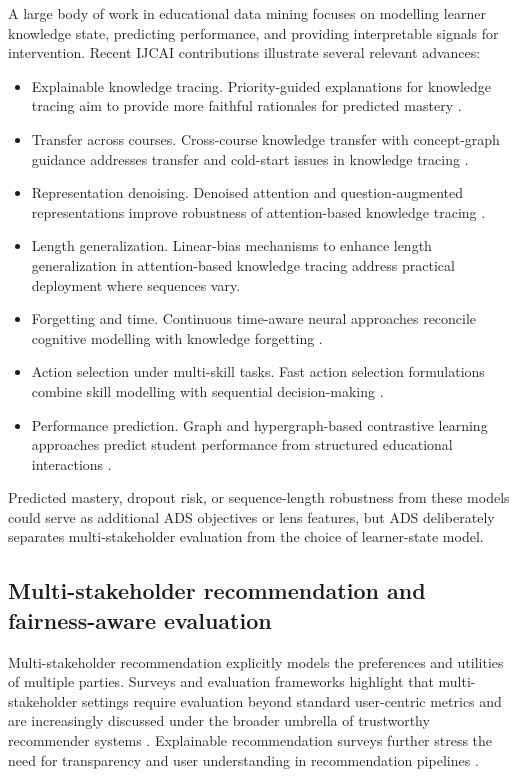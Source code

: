\documentclass[sigconf,review]{acmart}
\begin{document}
A large body of work in educational data mining focuses on modelling learner knowledge state, predicting performance, and providing interpretable signals for intervention.
Recent IJCAI contributions illustrate several relevant advances:
\begin{itemize}
    \item {Explainable knowledge tracing.} Priority-guided explanations for knowledge tracing aim to provide more faithful rationales for predicted mastery \cite{li2025pgexplainkt}.
    \item {Transfer across courses.} Cross-course knowledge transfer with concept-graph guidance addresses transfer and cold-start issues in knowledge tracing \cite{han2025transkt}.
    \item {Representation denoising.} Denoised attention and question-augmented representations improve robustness of attention-based knowledge tracing \cite{deng2025denoisekt}.
    \item {Length generalization.} Linear-bias mechanisms to enhance length generalization in attention-based knowledge tracing \cite{li2024stablekt} address practical deployment where sequences vary.
    \item {Forgetting and time.} Continuous time-aware neural approaches reconcile cognitive modelling with knowledge forgetting \cite{ma2022ctncm}.
    \item {Action selection under multi-skill tasks.} Fast action selection formulations combine skill modelling with sequential decision-making \cite{salomons2021bktpomdp}.
    \item {Performance prediction.} Graph and hypergraph-based contrastive learning approaches predict student performance from structured educational interactions \cite{song2025mhmgcl}.
\end{itemize}

\noindent
Predicted mastery, dropout risk, or sequence-length robustness from these models could serve as additional ADS objectives or lens features, but ADS deliberately separates multi-stakeholder evaluation from the choice of learner-state model.

\subsection{Multi-stakeholder recommendation and fairness-aware evaluation}
\label{sec:rw-ms}

Multi-stakeholder recommendation explicitly models the preferences and utilities of multiple parties.
Surveys and evaluation frameworks highlight that multi-stakeholder settings require evaluation beyond standard user-centric metrics \cite{abdollahpouri2020multistakeholder,burke2025mseval} and are increasingly discussed under the broader umbrella of trustworthy recommender systems \cite{ge2024trustworthyRS}.
Explainable recommendation surveys further stress the need for transparency and user understanding in recommendation pipelines \cite{zhang2020explainableRS}.
\end{document}
